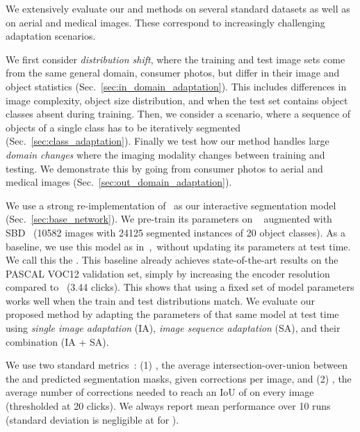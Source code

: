 We extensively evaluate our \imageSGD{} and \datasetSGD{} methods on several standard datasets as well as on aerial and medical images. These correspond to increasingly challenging adaptation scenarios.

We first consider \textit{distribution shift}, where the training and test image sets come from the same general domain, consumer photos, but differ in their image and object statistics (Sec.~\ref{sec:in_domain_adaptation}).
This includes differences in image complexity, object size distribution, and when the test set contains object classes absent during training.
Then, we consider a \textit{\classspecialisation{}} scenario, where a sequence of objects of a single class has to be iteratively segmented 
(Sec.~\ref{sec:class_adaptation}).
Finally we test how our method handles large \textit{domain changes} where the imaging modality changes between training and testing. We demonstrate this by going from consumer photos to aerial and medical images (Sec.~\ref{sec:out_domain_adaptation}).

  We use a strong re-implementation of~\cite{mahadevan18bmvc} as our interactive segmentation model (Sec.~\ref{sec:base_network}). We pre-train its parameters on \pascal{}~\cite{pascal-voc-2012} augmented with SBD~\cite{hariharan11iccv} (10582 images with 24125 segmented instances of 20 object classes).
As a baseline, we use this model as in~\cite{mahadevan18bmvc},~\ie without updating its parameters at test time.
We call this the \emph{\fixedmodellong}. This baseline already achieves state-of-the-art results on the PASCAL VOC12 validation set, simply by increasing the encoder resolution compared to~\cite{mahadevan18bmvc}
(3.44 clicks).
This shows that using a fixed set of model parameters works well when the train and test distributions match. 
We evaluate our proposed method by adapting the parameters of that same model at test time using \emph{single image adaptation} (IA), \emph{image sequence adaptation} (SA), and their combination (IA + SA).

We use
two standard metrics~\cite{xu16cvpr,liew17iccv,benard17arxiv,mahadevan18bmvc,li18cvpr,benenson19cvpr,jang19cvpr}:
(1) \textbf{\iouAtK{}}, the average intersection-over-union between the \gt{} and predicted segmentation masks, given  corrections per image,
and (2) \textbf{\clicksAtIOU{}}, the average number of corrections needed to reach an IoU of  on every image (thresholded at 20 clicks).
We always report mean performance over 10 runs (standard deviation is negligible at  for \clicksAtIOU{}).

